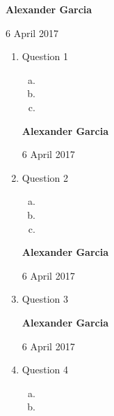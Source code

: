 \documentclass[11pt]{article}
\begin{document}
\textbf{Alexander Garcia}

6 April 2017 \\

\begin{enumerate}

	\item Question 1

		\begin{enumerate}[(a)]

			\item

			\item

			\item

		\end{enumerate}

	\newpage

	\textbf{Alexander Garcia}

	6 April 2017 \\

	\item Question 2

		\begin{enumerate}[(a)]

			\item

			\item

			\item

		\end{enumerate}

		\newpage

		\textbf{Alexander Garcia}

		6 April 2017 \\

	\item Question 3

		\newpage

		\textbf{Alexander Garcia}

		6 April 2017 \\

	\item Question 4

		\begin{enumerate}[(a)]

			\item

			\item

		\end{enumerate}


\end{enumerate}
\end{document}
